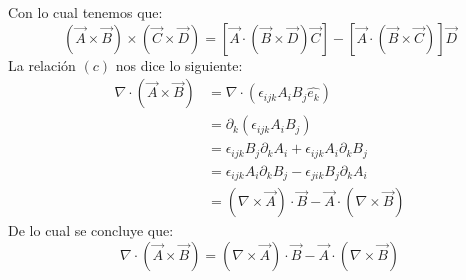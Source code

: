 \documentclass[11pt,letterpaper]{article}
\begin{document}
Con lo cual tenemos que:
\begin{equation}
    (\vec{A}\times \vec{B})\times (\vec{C}\times\vec{D}) = [\vec{A}\cdot (\vec{B} \times \vec{D})\vec{C}]- [\vec{A}\cdot (\vec{B}\times\vec{C})]\vec{D} 
\end{equation}
La relación $(c)$ nos dice lo siguiente: 
\begin{align*}
    \nabla \cdot (\vec{A}\times \vec{B})  &= \nabla \cdot (\epsilon_{ijk}A_iB_j\hat{e_k}) \\
    & = \partial_k(\epsilon_{ijk}A_iB_j) \\
    & = \epsilon_{ijk}B_j\partial_kA_i + \epsilon_{ijk}A_i\partial_kB_j \\
    & = \epsilon_{ijk}A_i\partial_kB_j - \epsilon_{jik}B_j\partial_k A_i \\
    & = (\nabla \times \vec{A})\cdot \vec{B}  - \vec{A} \cdot (\nabla \times \vec{B}) 
\end{align*}
De lo cual se concluye que:
\begin{equation}
    \nabla \cdot (\vec{A}\times \vec{B}) = (\nabla \times \vec{A})\cdot \vec{B}  - \vec{A} \cdot (\nabla \times \vec{B}) 
\end{equation}

\end{document}

